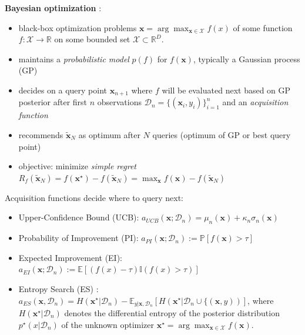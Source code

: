 \begin{block}{}
\textbf{Bayesian optimization} \cite{shahriari_taking_2016}:
\begin{itemize}
\item black-box optimization problems $\mathbf{x} = \arg\max_{\mathbf{x} \in \mathcal{X}} f(x)$ of some function $f: \mathcal{X} \to \mathbb{R}$ on some bounded set $\mathcal{X} \subset \mathbb{R}^D$.
\item maintains a \emph{probabilistic model} $p(f)$ for $f(\mathbf{x})$, typically a Gaussian process (GP)
\item decides on a query point $\mathbf{x}_{n+1}$ where $f$ will be evaluated next based on GP posterior after first $n$ observations $\mathcal{D}_n=\{(\mathbf{x}_i, y_i)\}_{i=1}^n$ and an \emph{acquisition function}
\item recommends $\mathbf{\tilde x}_N$ as optimum after $N$ queries (optimum of GP or best query point)
\item objective: minimize \emph{simple regret} 
$R_f(\mathbf{\tilde  x}_N) = f(\mathbf{x}^\star) - f(\mathbf{\tilde  x}_N) = \max_{\mathbf{x}} f(\mathbf{x}) - f(\mathbf{\tilde x}_N)$
\end{itemize}

Acquisition functions decide where to query next:
\begin{itemize}
\item Upper-Confidence Bound (UCB): $a_{UCB}(\mathbf{x};
\mathcal{D}_n) = \mu_{n}(\mathbf{x}) + \kappa_n \sigma_{n}(\mathbf{x})$
\item Probability of Improvement (PI): $a_{PI}(\mathbf{x}; \mathcal{D}_n) := \mathbb{P}[f(\mathbf{x}) > \tau]$
\item Expected Improvement (EI): $a_{EI}(\mathbf{x}; \mathcal{D}_n) := \mathbb{E}[(f(x) - \tau)\mathbb{I}(f(x) > \tau)]$
\item Entropy Search (ES) \cite{hennig_entropy_2012}: $a_{ES}(\mathbf{x}, \mathcal{D}_n)
  = H(\mathbf{x}^\star \vert \mathcal{D}_n) - \mathbb{E}_{y \vert \mathbf{x}, \mathcal{D}_n}
	[H(\mathbf{x}^\star \vert \mathcal{D}_n \cup \{(\mathbf{x}, y))]$,
	where $H(\mathbf{x}^\star \vert \mathcal{D}_n)$ denotes the differential entropy
of the posterior distribution $p^\star(x \vert \mathcal{D}_n)$ of the unknown optimizer $\mathbf{x}^\star = \arg\max_{\mathbf{x} \in \mathcal{X}} f(\mathbf{x})$.
\end{itemize}

\end{block}

